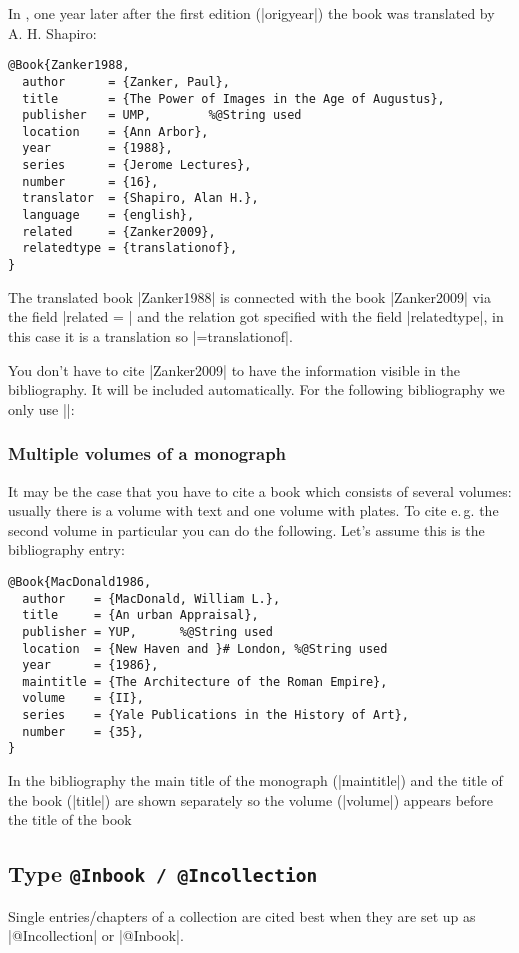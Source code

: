 \documentclass[a4paper,
10pt,
greek,
french,
spanish,
italian,
ngerman,
english
]{ltxdoc}
\begin{document}
In \citeyear{Zanker1988}, one year later after the first edition (|origyear|) the book was translated by A. H. Shapiro:
\begin{lstlisting}[style=bibentry,label=Zanker1988,caption={{@}Book\{Zanker1988,…\} }]
@Book{Zanker1988,
  author      = {Zanker, Paul},
  title       = {The Power of Images in the Age of Augustus},
  publisher   = UMP,		%@String used
  location    = {Ann Arbor},
  year        = {1988},
  series      = {Jerome Lectures},
  number      = {16},
  translator  = {Shapiro, Alan H.},
  language    = {english},
  related     = {Zanker2009},
  relatedtype = {translationof},
}
\end{lstlisting}

The translated book |Zanker1988| is connected with the book |Zanker2009| via the field |related = | 
and the relation got specified with the field |relatedtype|, in this case it is a translation so |={translationof}|.

You don't have to cite |Zanker2009| to have the information visible in the bibliography. 
It will be included automatically. For the following bibliography we only use |\cite{Zanker1988}|:



\subsubsection{Multiple volumes of a monograph}
It may be the case that you have to cite a book which consists of several volumes:
usually there is a volume with text and one volume with plates.
To cite  e.\,g. the second volume in particular you can do the following.
Let’s assume this is the bibliography entry:
\begin{lstlisting}[style=bibentry,label=MacDonald1986,caption={{@}Book\{MacDonald1986,…\} }]
@Book{MacDonald1986,
  author    = {MacDonald, William L.},
  title     = {An urban Appraisal},
  publisher = YUP,		%@String used
  location  = {New Haven and }# London, %@String used
  year      = {1986},
  maintitle = {The Architecture of the Roman Empire},
  volume    = {II},
  series    = {Yale Publications in the History of Art},
  number    = {35},
}
\end{lstlisting}
In the bibliography the main title of the monograph (|maintitle|)
and the title of the book (|title|) are shown separately  so the volume  (|volume|) 
appears before the title of the book


\subsection{Type \texttt{@Inbook / @Incollection}}\label{inbook}
Single entries/chapters of a collection are cited best when they are set up as  |@Incollection| or |@Inbook|.
\end{document}
